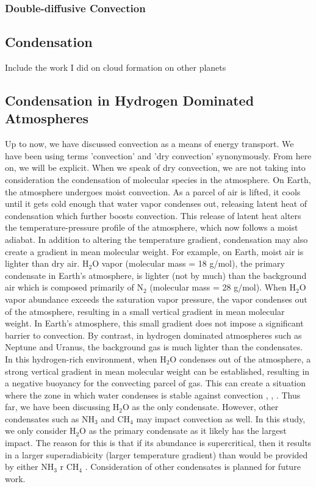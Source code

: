 \documentclass[11pt]{ucscthesisbs}
\begin{document}
\subsubsection{Double-diffusive Convection}


\subsection{Condensation}

Include the work I did on cloud formation on other planets


\subsection{Condensation in Hydrogen Dominated Atmospheres}
Up to now, we have discussed convection as a means of energy transport. We have been using terms 'convection' and 'dry convection' synonymously.  From here on, we will be explicit. When we speak of dry convection, we are not taking into consideration the condensation of molecular species in the atmosphere. On Earth, the atmosphere undergoes moist convection. As a parcel of air is lifted, it cools until it gets cold enough that water vapor condenses out, releasing latent heat of condensation which further boosts convection. This release of latent heat alters the temperature-pressure profile of the atmosphere, which now follows a moist adiabat.  In addition to altering the temperature gradient, condensation may also create a gradient in mean molecular weight. For example, on Earth, moist air is lighter than dry air. H$_{2}$O vapor (molecular mass = 18 g/mol), the primary condensate in Earth's atmosphere, is lighter (not by much) than the background air which is composed primarily of N$_{2}$ (molecular mass = 28 g/mol). When H$_{2}$O vapor abundance exceeds the saturation vapor pressure, the vapor condenses out of the atmosphere, resulting in a small vertical gradient in mean molecular weight. In Earth's atmosphere, this small gradient does not impose a significant barrier to convection. By contrast, in hydrogen dominated atmospheres such as Neptune and Uranus, the background gas is much lighter than the condensates. In this hydrogen-rich environment, when H$_{2}$O condenses out of the atmosphere, a strong vertical gradient in mean molecular weight can be established, resulting in a negative buoyancy for the convecting parcel of gas. This can create a situation where the zone in which water condenses is stable against convection \citep{guillot_1995}, \citep{friedson_2017}, \citep{leconte_2017}. Thus far, we have been discussing H$_{2}$O as the only condensate. However, other condensates such as NH$_{3}$ and CH$_{4}$ may impact convection as well. In this study, we only consider H$_{2}$O as the primary condensate as it likely has the largest impact. The reason for this is that if its abundance is supercritical, then it results in a larger superadiabicity (larger temperature gradient) than would be provided by either NH$_{3}$ r CH$_{4}$ \citep{guillot_1995}. Consideration of other condensates is planned for future work.
\end{document}
